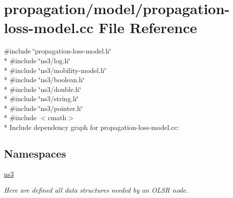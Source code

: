 \hypertarget{propagation-loss-model_8cc}{}\section{propagation/model/propagation-\/loss-\/model.cc File Reference}
\label{propagation-loss-model_8cc}
{\ttfamily \#include \char`\"{}propagation-\/loss-\/model.\+h\char`\"{}}\\*
{\ttfamily \#include \char`\"{}ns3/log.\+h\char`\"{}}\\*
{\ttfamily \#include \char`\"{}ns3/mobility-\/model.\+h\char`\"{}}\\*
{\ttfamily \#include \char`\"{}ns3/boolean.\+h\char`\"{}}\\*
{\ttfamily \#include \char`\"{}ns3/double.\+h\char`\"{}}\\*
{\ttfamily \#include \char`\"{}ns3/string.\+h\char`\"{}}\\*
{\ttfamily \#include \char`\"{}ns3/pointer.\+h\char`\"{}}\\*
{\ttfamily \#include $<$cmath$>$}\\*
Include dependency graph for propagation-\/loss-\/model.cc\+:
\subsection*{Namespaces}
\begin{DoxyCompactItemize}
\item 
 \hyperlink{namespacens3}{ns3}
\begin{DoxyCompactList}\small\item\em Here are defined all data structures needed by an O\+L\+SR node. \end{DoxyCompactList}\end{DoxyCompactItemize}
